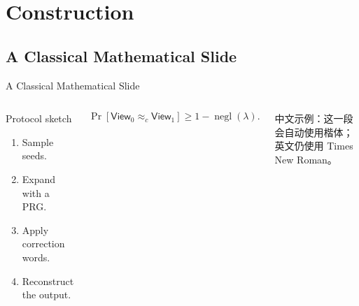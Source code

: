 \documentclass[aspectratio=169,11pt]{beamer}
\begin{document}
\section{Construction}

\subsection{A Classical Mathematical Slide}
\begin{frame}[t]{A Classical Mathematical Slide}
  \begin{MyPreContent}[top][left]
  \begin{columns}[T,onlytextwidth]
      \begin{block}{Protocol sketch}
        \begin{enumerate}
          \item Sample seeds.
          \item Expand with a PRG.
          \item Apply correction words.
          \item Reconstruct the output.
        \end{enumerate}
      \end{block}

      \[
        \Pr[\mathsf{View}_0 \approx_c \mathsf{View}_1]
        \ge 1-\operatorname{negl}(\lambda).
      \]

      中文示例：这一段会自动使用楷体；英文仍使用 Times New Roman。
  \end{columns}
  \end{MyPreContent}
\end{frame}
\end{document}
